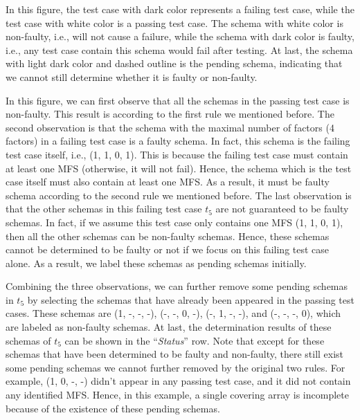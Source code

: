 In this figure, the test case with dark color represents a failing test case, while the test case with white color is a passing test case. The schema with white color is non-faulty, i.e., will not cause a failure, while the schema with dark color is faulty, i.e., any test case contain this schema would fail after testing. At last, the schema with light dark color and dashed outline is the pending schema, indicating that we cannot still determine whether it is faulty or non-faulty.

In this figure, we can first observe that all the schemas in the passing test case is non-faulty. This result is according to the first rule we mentioned before. The second observation is that the schema with the maximal number of factors (4 factors) in a failing test case is a faulty schema. In fact, this schema is the failing test case itself, i.e., (1, 1, 0, 1). This is because the failing test case must contain at least one MFS (otherwise, it will not fail). Hence, the schema which is the test case itself must also contain at least one MFS. As a result, it must be faulty schema according to the second rule we mentioned before. The last observation is that the other schemas in this failing test case $t_{5}$ are not guaranteed to be faulty schemas. In fact, if we assume this test case only contains one MFS (1, 1, 0, 1), then all the other schemas can be non-faulty schemas. Hence, these schemas cannot be determined to be faulty or not if we focus on this failing test case alone. As a result, we label these schemas as pending schemas initially.

Combining the three observations, we can further remove some pending schemas in $t_{5}$ by selecting the schemas that have already been appeared in the passing test cases. These schemas are (1, -, -, -), (-, -, 0, -), (-, 1, -, -), and (-, -, -, 0), which are labeled as non-faulty schemas. At last, the determination results of these schemas of $t_{5}$ can be shown in the ``\emph{Status}'' row. Note that except for these schemas that have been determined to be faulty and non-faulty, there still exist some pending schemas we cannot further removed by the original two rules. For example, (1, 0, -, -) didn't appear in any passing test case, and it did not contain any identified MFS. Hence, in this example, a single covering array is incomplete because of the existence of these pending schemas.

%
%
%

